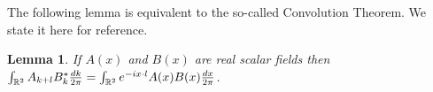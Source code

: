 \documentclass[noinfoline]{imsart}
\newtheorem{lemma}{Lemma}
\begin{document}
The following lemma is equivalent to the so-called Convolution Theorem. We state it here for reference.
\begin{lemma}
\label{conv}
If $A(x)$ and $B(x)$ are real scalar fields then  $\int_{\Bbb R^2} A_{k+l}  B^*_k \frac{dk}{2\pi}= \int_{\Bbb R^2} e^{-ix\cdot l} A(x)B(x)\frac{dx}{2\pi}$.
\end{lemma}

\end{document}
